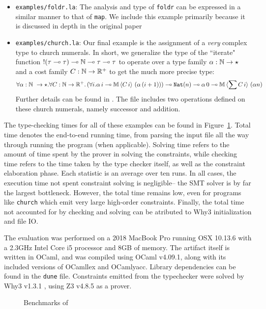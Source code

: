 \begin{itemize}
  \item \texttt{examples/foldr.la}: The analysis and type of \texttt{foldr} can be expressed in a similar manner to that of \texttt{map}. We include this example primarily because it is discussed in depth in the original \lambdaamor paper \cite{rajani-et-al:popl21}
  \item \texttt{examples/church.la}: Our final example is the assignment of a \textit{very} complex type to church numerals. In short, we generalize the type of the ``iterate" function $!(\tau \multimap \tau) \multimap \mathbb{N} \multimap \tau \multimap \tau$ to operate over a type family $\alpha : \mathbb{N} \to \star$ and a cost family $C : \mathbb{N} \to \mathbb{R}^+$ to get the much more precise type:
  $$
   \forall \alpha : \mathbb{N} \ \to \star. \forall C : \mathbb{N} \to \mathbb{R}^+. \left(\forall i. \alpha \, i \multimap \mathbb{M} \, \langle C \, i \rangle \, \left(\alpha \, (i+1)\right)\right) \multimap \texttt{Nat}(n) \multimap \alpha \, 0 \multimap \mathbb{M} \, \langle \sum C\, i\rangle \, \left(\alpha n\right)
  $$
  Further details can be found in \citet{rajani-et-al:popl21}. The file includes two operations defined on these church numerals, namely successor and addition.
\end{itemize}

The type-checking times for all of these examples can be found in Figure~\ref{fig:lambdaamorimpl-eval}. Total time denotes the end-to-end running time, from parsing the input file all the way through running the program (when applicable). Solving time refers to the amount of time spent by the prover in solving the constraints, while checking time refers to the time taken by the type checker itself, as well as the constraint elaboration phase. Each statistic is an average over ten runs. In all cases, the execution time not spent constraint solving is negligible-- the SMT solver is by far the largest bottleneck. However, the total time remains low, even for programs like \texttt{church} which emit very large high-order constraints. Finally, the total time not accounted for by checking and solving can be atributed to Why3 initialization and file IO. 

The evaluation was performed on a 2018 MacBook Pro running OSX 10.13.6 with a 2.3GHz Intel Core i5 processor and 8GB of memory. The artifact itself is written in OCaml, and was compiled using OCaml v4.09.1, along with its included versions of OCamllex and OCamlyacc. Library dependencies can be found in the \texttt{dune} file. Constraints emitted from the typechecker were solved by Why3 v1.3.1 \citehere, using Z3 v4.8.5 \citehere as a prover.

\begin{figure}

\caption{Benchmarks of \lambdaamorimpl}
\label{fig:lambdaamorimpl-eval}
\end{figure}


